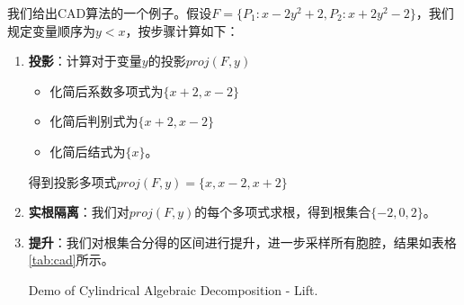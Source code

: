 \begin{example}
我们给出CAD算法的一个例子。假设$F = \{P_1: x - 2y^2 + 2, P_2: x + 2y^2 - 2\}$，我们规定变量顺序为$y < x$，按步骤计算如下：
\begin{enumerate}
    \item \textbf{投影}：计算对于变量$y$的投影$proj(F, y)$
    \begin{itemize}
        \item 化简后系数多项式为$\{x + 2, x - 2\}$
        \item 化简后判别式为$\{x + 2, x - 2\}$
        \item 化简后结式为$\{x\}$。
    \end{itemize}
    得到投影多项式$proj(F, y) = \{x, x - 2, x + 2\}$

    \item \textbf{实根隔离}：我们对$proj(F, y)$的每个多项式求根，得到根集合$\{-2, 0, 2\}$。
    \item \textbf{提升}：我们对根集合分得的区间进行提升，进一步采样所有胞腔，结果如表格\ref{tab:cad}所示。
    \begin{table}[]
        \tiny
        \centering
         {Demo of Cylindrical Algebraic Decomposition - Lift.}
        \label{tab:cad}
    \end{table}
\end{enumerate}
\label{ex:cad}    
\end{example}

